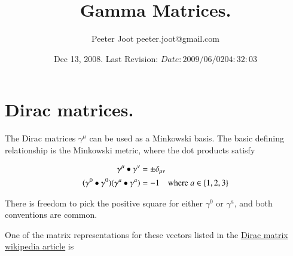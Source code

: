\usepackage[bookmarks=true]{hyperref}

\usepackage{color,cite,graphicx}
\usepackage{latexsym,amssymb,epsf} %


\title{ Gamma Matrices. }
\author{Peeter Joot \quad peeter.joot@gmail.com}
\date{ Dec 13, 2008.  Last Revision: $Date: 2009/06/02 04:32:03 $ }



\maketitle{}


\section{Dirac matrices. }

The Dirac matrices $\gamma^\mu$ can be used as a Minkowski basis.  The basic defining relationship is the Minkowski metric, where the dot products satisfy

\begin{align*}
{\gamma^\mu} \bullet {\gamma^\nu} &= \pm \delta_{\mu\nu} \\
({\gamma^0} \bullet {\gamma^0})({\gamma^a} \bullet {\gamma^a}) &= -1 \quad \text{where $a \in \{1,2,3\}$}
\end{align*}

There is freedom to pick the positive square for either $\gamma^0$ or $\gamma^a$, and both conventions are common.

One of the matrix representations for these vectors listed in the 
\href{http://en.wikipedia.org/wiki/Gamma_matrices}{Dirac matrix wikipedia article}
is

